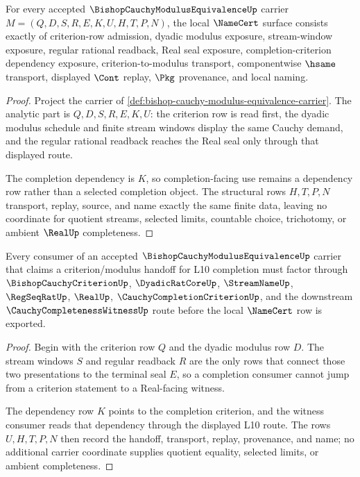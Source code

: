 \begin{theorem}
\label{thm:bishop-cauchy-modulus-equivalence-namecert-obligations}
For every accepted $\BishopCauchyModulusEquivalenceUp$ carrier $M=(Q,D,S,R,E,K,U,H,T,P,N)$, the local $\NameCert$ surface consists exactly of criterion-row admission, dyadic modulus exposure, stream-window exposure, regular rational readback, Real seal exposure, completion-criterion dependency exposure, criterion-to-modulus transport, componentwise $\hsame$ transport, displayed $\Cont$ replay, $\Pkg$ provenance, and local naming.
\end{theorem}
\begin{proof}
Project the carrier of \autoref{def:bishop-cauchy-modulus-equivalence-carrier}. The analytic part is $Q,D,S,R,E,K,U$: the criterion row is read first, the dyadic modulus schedule and finite stream windows display the same Cauchy demand, and the regular rational readback reaches the Real seal only through that displayed route.

The completion dependency is $K$, so completion-facing use remains a dependency row rather than a selected completion object. The structural rows $H,T,P,N$ transport, replay, source, and name exactly the same finite data, leaving no coordinate for quotient streams, selected limits, countable choice, trichotomy, or ambient $\RealUp$ completeness.
\end{proof}

\begin{theorem}
\label{thm:bishop-cauchy-modulus-equivalence-consumer-route}
Every consumer of an accepted $\BishopCauchyModulusEquivalenceUp$ carrier that claims a criterion/modulus handoff for L10 completion must factor through $\BishopCauchyCriterionUp$, $\DyadicRatCoreUp$, $\StreamNameUp$, $\RegSeqRatUp$, $\RealUp$, $\CauchyCompletionCriterionUp$, and the downstream $\CauchyCompletenessWitnessUp$ route before the local $\NameCert$ row is exported.
\end{theorem}
\begin{proof}
Begin with the criterion row $Q$ and the dyadic modulus row $D$. The stream windows $S$ and regular readback $R$ are the only rows that connect those two presentations to the terminal seal $E$, so a completion consumer cannot jump from a criterion statement to a Real-facing witness.

The dependency row $K$ points to the completion criterion, and the witness consumer reads that dependency through the displayed L10 route. The rows $U,H,T,P,N$ then record the handoff, transport, replay, provenance, and name; no additional carrier coordinate supplies quotient equality, selected limits, or ambient completeness.
\end{proof}

